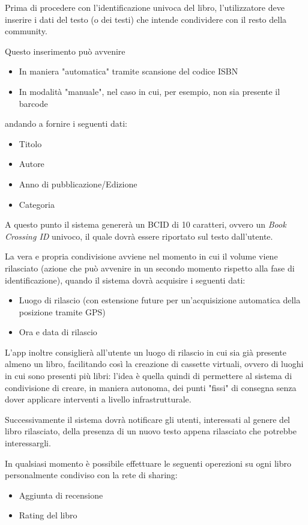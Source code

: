 Prima di procedere con l'identificazione univoca del libro, l'utilizzatore deve inserire i dati 
del testo (o dei testi) che intende condividere con il resto della community.

Questo inserimento può avvenire
\begin{itemize}
	\item In maniera "automatica" tramite scansione del codice ISBN
	\item In modalità "manuale", nel caso in cui, per esempio, non sia presente il barcode
\end{itemize}
andando a fornire i seguenti dati:
\begin{itemize}
	\item Titolo
	\item Autore
	\item Anno di pubblicazione/Edizione
	\item Categoria
\end{itemize}

A questo punto il sistema genererà un BCID di 10 caratteri, ovvero un \textit{Book Crossing ID} univoco, il
quale dovrà essere riportato sul testo dall'utente.


La vera e propria condivisione avviene nel momento in cui il volume viene rilasciato (azione che può avvenire in un secondo momento
rispetto alla fase di identificazione), quando il sistema dovrà acquisire i seguenti dati:
\begin{itemize}
	\item Luogo di rilascio (con estensione future per un'acquisizione automatica della posizione tramite GPS)
	\item Ora e data di rilascio 
\end{itemize}

L'app inoltre consiglierà all'utente un luogo di rilascio in cui sia già presente almeno un libro, 
facilitando così la creazione di cassette virtuali, ovvero di luoghi in cui sono presenti più libri: 
l'idea è quella quindi di permettere al sistema di condivisione di creare, in maniera autonoma, dei punti "fissi" di 
consegna senza dover applicare interventi a livello infrastrutturale.

Successivamente il sistema dovrà notificare gli utenti, interessati al genere del 
libro rilasciato, della presenza di un nuovo testo appena rilasciato che potrebbe interessargli.

In qualsiasi momento è possibile effettuare le seguenti operezioni su ogni libro personalmente 
condiviso con la rete di sharing:
\begin{itemize}
	\item Aggiunta di recensione
	\item Rating del libro
\end{itemize}

